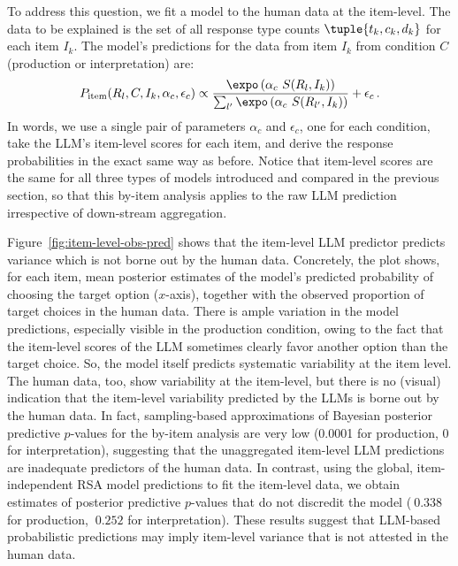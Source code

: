 \documentclass[fleqn]{article}
\begin{document}
To address this question, we fit a model to the human data at the item-level.
The data to be explained is the set of all response type counts $\tuple{t_{k}, c_{k}, d_{k}}$ for each item $I_{k}$.
The model's predictions for the data from item $I_{k}$ from condition $C$ (production or interpretation) are:
%
\begin{align*}
  P_{\text{item}}(R_{l}, C, I_{k}, \alpha_{c}, \epsilon_{c}) \propto \frac{\expo \left( \alpha_{c} \ S(R_{l}, I_{k}) \right )}{ \sum_{l'} \expo \left( \alpha_{c} \ S(R_{l'}, I_{k}) \right )} + \epsilon_{c}\,.
\end{align*}
%
In words, we use a single pair of parameters $\alpha_{c}$ and $\epsilon_{c}$, one for each condition, take the LLM's item-level scores for each item, and derive the response probabilities in the exact same way as before.
Notice that item-level scores are the same for all three types of models introduced and compared in the previous section, so that this by-item analysis applies to the raw LLM prediction irrespective of down-stream aggregation.

Figure~\ref{fig:item-level-obs-pred} shows that the item-level LLM predictor predicts variance which is not borne out by the human data.
Concretely, the plot shows, for each item, mean posterior estimates of the model's predicted probability of choosing the target option ($x$-axis), together with the observed proportion of target choices in the human data.
There is ample variation in the model predictions, especially visible in the production condition, owing to the fact that the item-level scores of the LLM sometimes clearly favor another option than the target choice.
So, the model itself predicts systematic variability at the item level.
The human data, too, show variability at the item-level, but there is no (visual) indication that the item-level variability predicted by the LLMs is borne out by the human data.
In fact, sampling-based approximations of Bayesian posterior predictive $p$-values for the by-item analysis are very low (0.0001 for production, 0 for interpretation), suggesting that the unaggregated item-level LLM predictions are inadequate predictors of the human data.
In contrast, using the global, item-independent RSA model predictions to fit the item-level data, we obtain estimates of posterior predictive $p$-values that do not discredit the model ($~0.338$ for production, $~0.252$ for interpretation).
These results suggest that LLM-based probabilistic predictions may imply item-level variance that is not attested in the human data.
\end{document}
